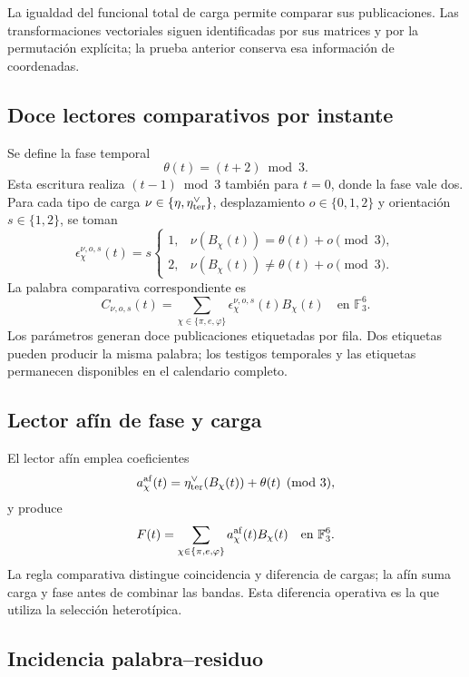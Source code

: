 La igualdad del funcional total de carga permite comparar sus
publicaciones. Las transformaciones vectoriales siguen identificadas
por sus matrices y por la permutación explícita; la prueba anterior
conserva esa información de coordenadas.

\subsection{Doce lectores comparativos por instante}

Se define la fase temporal
\[
 \theta(t)=(t+2)\bmod3.
\]
Esta escritura realiza $(t-1)\bmod3$ también para $t=0$, donde la fase
vale dos. Para cada tipo de carga
$\nu\in\{\eta,\eta_{\rm ter}^\vee\}$, desplazamiento
$o\in\{0,1,2\}$ y orientación $s\in\{1,2\}$, se toman
\[
 \epsilon_\chi^{\nu,o,s}(t)=s
 \begin{cases}
 1,&\nu(B_\chi(t))=\theta(t)+o\pmod3,\\
 2,&\nu(B_\chi(t))\ne\theta(t)+o\pmod3.
 \end{cases}
\]
La palabra comparativa correspondiente es
\begin{equation}
 C_{\nu,o,s}(t)=
 \sum_{\chi\in\{\pi,e,\varphi\}}
 \epsilon_\chi^{\nu,o,s}(t)B_\chi(t)
 \quad\text{en }\mathbb F_3^6.
 \label{eq:kdes-comparativo}
\end{equation}
Los parámetros generan doce publicaciones etiquetadas por fila. Dos
etiquetas pueden producir la misma palabra; los testigos temporales y
las etiquetas permanecen disponibles en el calendario completo.

\subsection{Lector afín de fase y carga}

El lector afín emplea coeficientes
\[
 a_\chi^{\rm af}(t)=\eta_{\rm ter}^\vee(B_\chi(t))+\theta(t)
 \pmod3,
\]
y produce
\begin{equation}
 F(t)=\sum_{\chi\in\{\pi,e,\varphi\}}
 a_\chi^{\rm af}(t)B_\chi(t)
 \quad\text{en }\mathbb F_3^6.
 \label{eq:kdes-afin}
\end{equation}
La regla comparativa distingue coincidencia y diferencia de cargas;
la afín suma carga y fase antes de combinar las bandas. Esta diferencia
operativa es la que utiliza la selección heterotípica.

\subsection{Incidencia palabra--residuo}

